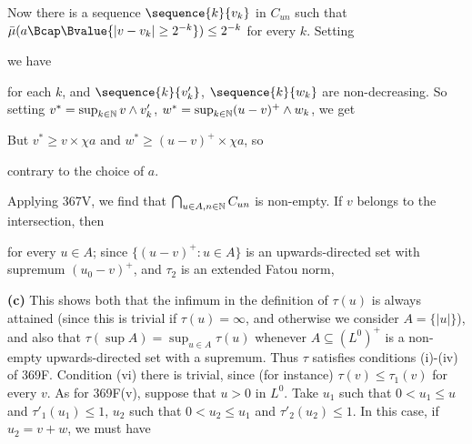 {
     
\noindent Now there is a sequence $\sequence{k}{v_k}$ in $C_{un}$ such
that $\bar\mu(a\Bcap\Bvalue{|v-v_k|\ge2^{-k}})\le 2^{-k}$ for every $k$.
Setting
     
     
\noindent we have
     
     
\noindent for each $k$, and $\sequence{k}{v'_k}$, $\sequence{k}{w_k}$
are non-decreasing.   So setting $v^*=\sup_{k\in\Bbb N}v\wedge v'_k$,
$w^*=\sup_{k\in\Bbb N}(u-v)^+\wedge w_k$, we get
     
     
\noindent But $v^*\ge v\times\chi a$ and $w^*\ge(u-v)^+\times\chi a$,
so
     
     
\noindent contrary to the choice of $a$.\ \Bang\Qed
     
Applying 367V, we find that $\bigcap_{u\in A,n\in\Bbb N}C_{un}$ is
non-empty.   If $v$ belongs to the intersection, then
     
     
\noindent for every $u\in A$;  since $\{(u-v)^+:u\in A\}$ is an
upwards-directed set with supremum $(u_0-v)^+$, and $\tau_2$ is an
extended Fatou norm,
     
     
\medskip
     
{\bf (c)} This shows both that the infimum in the definition of
$\tau(u)$ is always attained (since this is trivial if $\tau(u)=\infty$,
and otherwise we consider $A=\{|u|\}$), and also that $\tau(\sup
A)=\sup_{u\in A}\tau(u)$ whenever $A\subseteq (L^0)^+$ is a non-empty
upwards-directed set with a supremum.   Thus $\tau$ satisfies conditions
(i)-(iv) of 369F.   Condition (vi) there is trivial, since (for
instance) $\tau(v)\le\tau_1(v)$ for every $v$.
As for 369F(v), suppose that $u>0$ in $L^0$.   Take $u_1$ such that
$0<u_1\le u$ and $\tau'_1(u_1)\le 1$, $u_2$ such that $0<u_2\le u_1$ and
$\tau'_2(u_2)\le 1$.   In this case, if $u_2=v+w$, we must have
     
}
